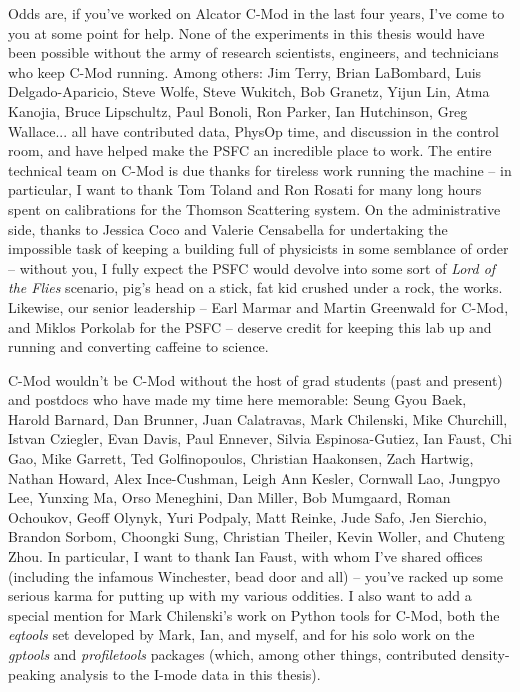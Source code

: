 Odds are, if you've worked on Alcator C-Mod in the last four years, I've come to you at some point for help.  None of the experiments in this thesis would have been possible without the army of research scientists, engineers, and technicians who keep C-Mod running.  Among others: Jim Terry, Brian LaBombard, Luis Delgado-Aparicio, Steve Wolfe, Steve Wukitch, Bob Granetz, Yijun Lin, Atma Kanojia, Bruce Lipschultz, Paul Bonoli, Ron Parker, Ian Hutchinson, Greg Wallace... all have contributed data, PhysOp time, and discussion in the control room, and have helped make the PSFC an incredible place to work.  The entire technical team on C-Mod is due thanks for tireless work running the machine -- in particular, I want to thank Tom Toland and Ron Rosati for many long hours spent on calibrations for the Thomson Scattering system.  On the administrative side, thanks to Jessica Coco and Valerie Censabella for undertaking the impossible task of keeping a building full of physicists in some semblance of order -- without you, I fully expect the PSFC would devolve into some sort of \emph{Lord of the Flies} scenario, pig's head on a stick, fat kid crushed under a rock, the works.  Likewise, our senior leadership -- Earl Marmar and Martin Greenwald for C-Mod, and Miklos Porkolab for the PSFC -- deserve credit for keeping this lab up and running and converting caffeine to science.

C-Mod wouldn't be C-Mod without the host of grad students (past and present) and postdocs who have made my time here memorable: Seung Gyou Baek, Harold Barnard, Dan Brunner, Juan Calatravas, Mark Chilenski, Mike Churchill, Istvan Cziegler, Evan Davis, Paul Ennever, Silvia Espinosa-Gutiez, Ian Faust, Chi Gao, Mike Garrett, Ted Golfinopoulos, Christian Haakonsen, Zach Hartwig, Nathan Howard, Alex Ince-Cushman, Leigh Ann Kesler, Cornwall Lao, Jungpyo Lee, Yunxing Ma, Orso Meneghini, Dan Miller, Bob Mumgaard, Roman Ochoukov, Geoff Olynyk, Yuri Podpaly, Matt Reinke, Jude Safo, Jen Sierchio, Brandon Sorbom, Choongki Sung, Christian Theiler, Kevin Woller, and Chuteng Zhou.  In particular, I want to thank Ian Faust, with whom I've shared offices (including the infamous Winchester, bead door and all) -- you've racked up some serious karma for putting up with my various oddities.  I also want to add a special mention for Mark Chilenski's work on Python tools for C-Mod, both the \emph{eqtools} set developed by Mark, Ian, and myself, and for his solo work on the \emph{gptools} and \emph{profiletools} packages (which, among other things, contributed density-peaking analysis to the I-mode data in this thesis).

